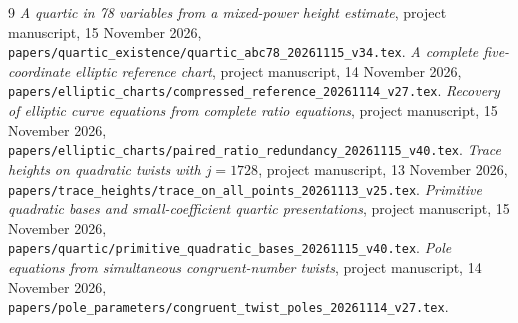 \documentclass[11pt,a4paper]{article}
\theoremstyle{remark}\newtheorem{remark}[theorem]{Remark}
\begin{document}
\begin{thebibliography}{9}
\emph{A quartic in 78 variables from a mixed-power height
estimate}, project manuscript, 15 November 2026,
\nolinkurl{papers/quartic_existence/quartic_abc78_20261115_v34.tex}.
\emph{A complete five-coordinate elliptic reference chart},
project manuscript, 14 November 2026,
\nolinkurl{papers/elliptic_charts/compressed_reference_20261114_v27.tex}.
\emph{Recovery of elliptic curve equations from complete
ratio equations}, project manuscript, 15 November 2026,
\nolinkurl{papers/elliptic_charts/paired_ratio_redundancy_20261115_v40.tex}.
\emph{Trace heights on quadratic twists with $j=1728$},
project manuscript, 13 November 2026,
\nolinkurl{papers/trace_heights/trace_on_all_points_20261113_v25.tex}.
\emph{Primitive quadratic bases and small-coefficient quartic
presentations},
project manuscript, 15 November 2026,
\nolinkurl{papers/quartic/primitive_quadratic_bases_20261115_v40.tex}.
\emph{Pole equations from simultaneous congruent-number
twists}, project manuscript, 14 November 2026,
\nolinkurl{papers/pole_parameters/congruent_twist_poles_20261114_v27.tex}.
\end{thebibliography}
\end{document}
